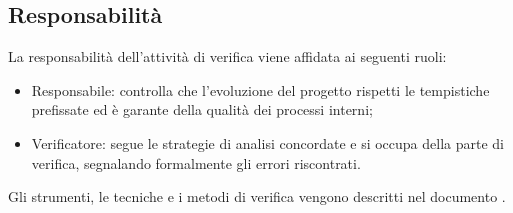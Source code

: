{    \subsection{Responsabilità}{
	La responsabilità dell'attività di verifica viene affidata ai seguenti ruoli:
	\begin{itemize}
	    \item Responsabile: controlla che l'evoluzione del progetto rispetti le tempistiche prefissate ed è garante della qualità dei 
		  processi interni;
	    \item Verificatore: segue le strategie di analisi concordate e si occupa della parte di verifica, segnalando formalmente gli errori
		  riscontrati.
	\end{itemize}

    }

    Gli strumenti, le tecniche e i metodi di verifica vengono descritti nel documento \textit{\NormeDiProgetto}.
}